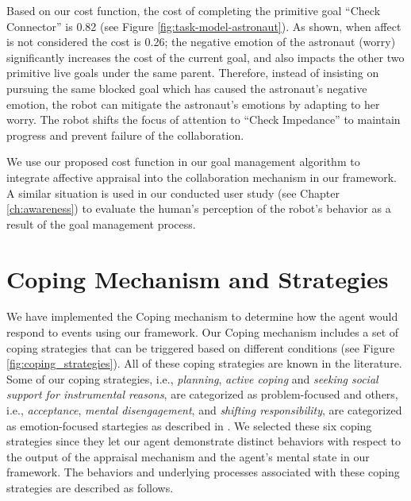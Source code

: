 \documentclass[12pt]{report}
\begin{document}
Based on our cost function, the cost of completing the primitive goal ``Check
Connector'' is 0.82 (see Figure \ref{fig:task-model-astronaut}). As shown, when
affect is not considered the cost is 0.26; the negative emotion of the astronaut
(worry) significantly increases the cost of the current goal, and also impacts
the other two primitive live goals under the same parent. Therefore, instead of
insisting on pursuing the same blocked goal which has caused the astronaut's
negative emotion, the robot can mitigate the astronaut's emotions by adapting to
her worry. The robot shifts the focus of attention to ``Check Impedance'' to
maintain progress and prevent failure of the collaboration.

We use our proposed cost function in our goal management algorithm to integrate
affective appraisal into the collaboration mechanism in our framework. A similar
situation is used in our conducted user study (see Chapter \ref{ch:awareness})
to evaluate the human's perception of the robot's behavior as a result of the
goal management process.

\section{Coping Mechanism and Strategies}
\label{sec:coping-mechanism}
We have implemented the Coping mechanism to determine how the agent would 
respond to events using our framework. Our Coping mechanism includes a set of
coping strategies that can be triggered based on different conditions (see
Figure \ref{fig:coping_strategies}). All of these coping strategies are known
in the literature. Some of our coping strategies, i.e., \textit{planning},
\textit{active coping} and \textit{seeking social support for instrumental
reasons}, are categorized as problem-focused and others, i.e.,
\textit{acceptance}, \textit{mental disengagement}, and \textit{shifting
responsibility}, are categorized as emotion-focused startegies as described in
\cite{gratch:domain-independent}. We selected these six coping strategies since
they let our agent demonstrate distinct behaviors with respect to the output of
the appraisal mechanism and the agent's mental state in our framework. The
behaviors and underlying processes associated with these coping strategies are described as follows.
\end{document}
